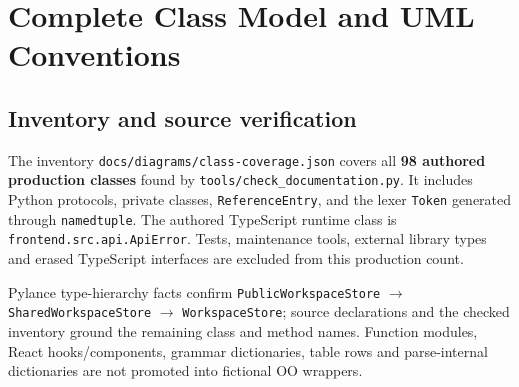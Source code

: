 \documentclass[11pt,a4paper]{article}
\begin{document}
\section{Complete Class Model and UML Conventions}
\subsection{Inventory and source verification}
The inventory \nolinkurl{docs/diagrams/class-coverage.json} covers all
\textbf{98 authored production classes} found by
\nolinkurl{tools/check_documentation.py}. It includes Python protocols, private
classes, \texttt{ReferenceEntry}, and the lexer \texttt{Token} generated through
\texttt{namedtuple}. The authored TypeScript runtime class is
\texttt{frontend.src.api.ApiError}. Tests, maintenance tools, external library
types and erased TypeScript interfaces are excluded from this production count.

Pylance type-hierarchy facts confirm
\texttt{PublicWorkspaceStore} $\rightarrow$ \texttt{SharedWorkspaceStore}
$\rightarrow$ \texttt{WorkspaceStore}; source declarations and the checked
inventory ground the remaining class and method names. Function modules,
React hooks/components, grammar dictionaries, table rows and parse-internal
dictionaries are not promoted into fictional OO wrappers.
\end{document}

